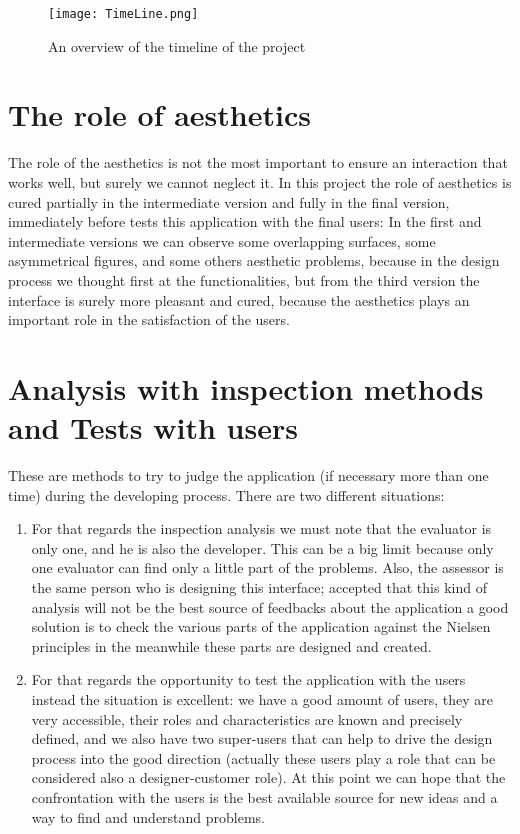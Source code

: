 \begin{figure}[H]
\centering
\texttt{[image: TimeLine.png]} 
\caption{An overview of the timeline of the project}
\end{figure}


\section{The role of aesthetics}
The role of the aesthetics is not the most important to ensure an interaction that works well, but surely we cannot neglect it. 
In this project the role of aesthetics is cured partially in the intermediate version and fully in the final version, immediately before tests this application with the final users:
In the first and intermediate versions we can observe some overlapping surfaces, some asymmetrical figures, and some others aesthetic problems, because in the design process we thought first at the functionalities, but from the third version the interface is surely more pleasant and cured, because the aesthetics plays an important role in the satisfaction of the users.  

\section{Analysis with inspection methods and Tests with users}
These are methods to try to judge the application (if necessary more than one time) during the developing process. There are two different situations:

\begin{enumerate}

\item For that regards the inspection analysis we must note that the evaluator is only one, and he is also the developer. This can be a big limit because only one evaluator can find only a little part of the problems. Also, the assessor is the same person who is designing this interface; accepted that this kind of analysis will not be the best source of feedbacks about the application a good solution is to check the various parts of the application against the Nielsen principles in the meanwhile these parts are designed and created.

\item For that regards the opportunity to test the application with the users instead the situation is excellent: we have a good amount of users, they are very accessible, their roles and characteristics are known and precisely defined, and we also have two super-users that can help to drive the design process into the good direction (actually these users play a role that can be considered also a designer-customer role). At this point we can hope that the confrontation with the users is the best available source for new ideas and a way to find and understand problems.    

\end{enumerate}

